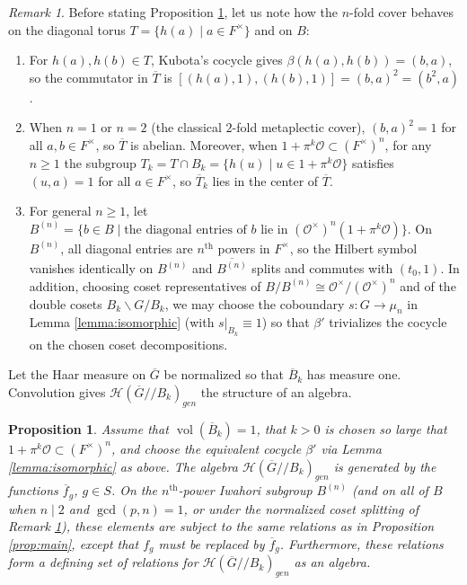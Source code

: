 \documentclass[12pt,letterpaper,reqno]{amsart}
\let\cal\mathcal
\newtheorem{proposition}[theorem]{Proposition}
\theoremstyle{definition}
\theoremstyle{remark}
\newtheorem{remark}[theorem]{Remark}
\numberwithin{equation}{section}
\begin{document}
\begin{remark}
\label{rem:torus_center}
Before stating Proposition \ref{prop:main2}, let us note how the $n$-fold
cover behaves on the diagonal torus $T=\{h(a)\mid a\in F^\times\}$ and on $B$:
\begin{enumerate}
\item For $h(a),h(b)\in T$, Kubota's cocycle gives $\beta(h(a),h(b))=(b,a)$,
so the commutator in $\overline{T}$ is
$[(h(a),1),(h(b),1)]=(b,a)^2=(b^2,a)$.
\item When $n=1$ or $n=2$ (the classical $2$-fold metaplectic cover),
$(b,a)^2=1$ for all $a,b\in F^\times$, so $\overline{T}$ is abelian. Moreover,
when $1+\pi^k{\cal O}\subset (F^\times)^n$, for any $n\ge 1$ the subgroup
$T_k=T\cap B_k=\{h(u)\mid u\in 1+\pi^k{\cal O}\}$ satisfies $(u,a)=1$ for all
$a\in F^\times$, so $\overline{T}_k$ lies in the center of $\overline{T}$.
\item For general $n\ge 1$, let $B^{(n)}=\{b\in B \mid \text{the diagonal entries
of } b \text{ lie in } ({\cal O}^\times)^n(1+\pi^k{\cal O})\}$. On $B^{(n)}$,
all diagonal entries are $n^{\text{th}}$ powers in $F^\times$, so the Hilbert
symbol vanishes identically on $B^{(n)}$ and $\overline{B^{(n)}}$ splits and
commutes with $(t_0,1)$. In addition, choosing coset representatives of
$B/B^{(n)}\cong {\cal O}^\times/({\cal O}^\times)^n$ and of the double cosets
$B_k\backslash G/B_k$, we may choose the coboundary $s:G\rightarrow \mu_n$ in
Lemma \ref{lemma:isomorphic} (with $s|_{B_k}\equiv 1$) so that $\beta'$
trivializes the cocycle on the chosen coset decompositions.
\end{enumerate}
\end{remark}

Let the Haar measure on $\overline{G}$ be normalized so that $\overline{B}_k$
has measure one. Convolution gives ${\cal H}(\overline{G}//B_k)_{gen}$ the
structure of an algebra.

\begin{proposition}
\label{prop:main2}
Assume that $\operatorname{vol}(\overline{B}_k)=1$, that $k>0$ is chosen so
large that $1+\pi^k{\cal O}\subset (F^\times)^n$, and choose the equivalent
cocycle $\beta'$ via Lemma \ref{lemma:isomorphic} as above. The algebra
${\cal H}(\overline{G}//B_k)_{gen}$ is generated by the functions
$\overline{f}_g$, $g\in S$. On the $n^{\text{th}}$-power Iwahori subgroup
$B^{(n)}$ (and on all of $B$ when $n\mid 2$ and $\gcd(p,n)=1$, or under the
normalized coset splitting of Remark \ref{rem:torus_center}), these elements
are subject to the same relations as in Proposition \ref{prop:main}, except
that $f_g$ must be replaced by $\overline{f}_g$. Furthermore, these relations
form a defining set of relations for ${\cal H}(\overline{G}//B_k)_{gen}$ as an
algebra.
\end{proposition}
\end{document}
